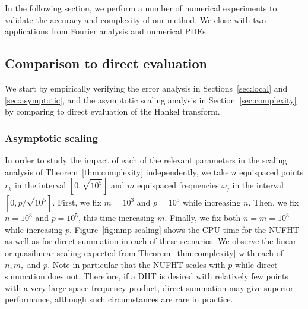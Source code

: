 In the following section, we perform a number of numerical experiments to
validate the accuracy and complexity of our method. We close with two
applications from Fourier analysis and numerical PDEs.

\subsection{Comparison to direct evaluation}

We start by empirically verifying the error analysis in Sections~\ref{sec:local}
and \ref{sec:asymptotic}, and the asymptotic scaling analysis in
Section~\ref{sec:complexity} by comparing to direct evaluation of the Hankel
transform.

\subsubsection{Asymptotic scaling}
In order to study the impact of each of the relevant parameters in the scaling
analysis of Theorem~\ref{thm:complexity} independently, we take $n$ equispaced
points $r_k$ in the interval $[0,\sqrt{10^5}]$ and $m$ equispaced frequencies
$\omega_j$ in the interval $[0,p/\sqrt{10^5}]$. First, we fix $m=10^3$ and
$p=10^5$ while increasing $n$. Then, we fix~$n=10^3$ and $p=10^5$, this time
increasing $m$. Finally, we fix both $n = m = 10^3$ while increasing $p$.
Figure~\ref{fig:nmp-scaling} shows the CPU time for the NUFHT as well as for
direct summation in each of these scenarios. We observe the linear or
quasilinear scaling expected from Theorem~\ref{thm:complexity} with each of $n,
m,$ and $p$. Note in particular that the NUFHT scales with $p$ while direct
summation does not. Therefore, if a DHT is desired with relatively few points
with a very large space-frequency product, direct summation may give superior
performance, although such circumstances are rare in practice.

